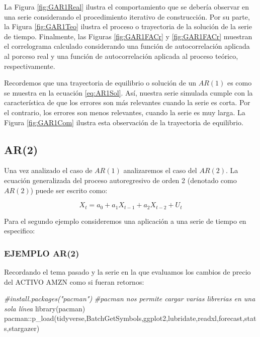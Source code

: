 \documentclass[
]{book}
\newenvironment{Shaded}{\begin{snugshade}}{\end{snugshade}}
\newcommand{\CommentTok}[1]{\textcolor[rgb]{0.56,0.35,0.01}{\textit{#1}}}
\newcommand{\FunctionTok}[1]{\textcolor[rgb]{0.00,0.00,0.00}{#1}}
\newcommand{\NormalTok}[1]{#1}
\newcommand{\SpecialCharTok}[1]{\textcolor[rgb]{0.00,0.00,0.00}{#1}}
\begin{document}
La Figura \ref{fig:GAR1Real} ilustra el comportamiento que se debería
observar en una serie considerando el procedimiento iterativo de
construcción. Por su parte, la Figura \ref{fig:GAR1Teo} ilustra el
proceso o trayectoria de la solución de la serie de tiempo. Finalmente,
las Figuras \ref{fig:GAR1FACr} y \ref{fig:GAR1FACr} muestran el
correlograma calculado considerando una función de autocorrelación
aplicada al porceso real y una función de autocorrelación aplicada al
proceso teórico, respectivamente.

Recordemos que una trayectoria de equilibrio o solución de un \(AR(1)\) es
como se muestra en la ecuación \eqref{eq:AR1Sol}. Así, nuestra serie
simulada cumple con la característica de que los errores son más
relevantes cuando la serie es corta. Por el contrario, los errores son
menos relevantes, cuando la serie es muy larga. La Figura
\ref{fig:GAR1Com} ilustra esta observación de la trayectoria de
equilibrio.

\hypertarget{ar2}{%
\subsection{AR(2)}\label{ar2}}

Una vez analizado el caso de \(AR(1)\) analizaremos el caso del \(AR(2)\).
La ecuación generalizada del proceso autoregresivo de orden 2 (denotado
como \(AR(2)\)) puede ser escrito como:

\begin{equation}
    X_t = a_0 + a_1 X_{t-1} + a_2 X_{t-2} + U_t
    \label{eq:AR2Eq}
\end{equation}

Para el segundo ejemplo consideremos una aplicación a una serie de
tiempo en especifico:

\hypertarget{ejemplo-ar2}{%
\subsubsection{EJEMPLO AR(2)}\label{ejemplo-ar2}}

Recordando el tema pasado y la serie en la que evaluamos los cambios de
precio del ACTIVO AMZN como si fueran retornos:

\begin{Shaded}
\begin{Highlighting}[]
\CommentTok{\#install.packages("pacman")}
\CommentTok{\#pacman nos permite cargar varias librerias en una sola línea}
\FunctionTok{library}\NormalTok{(pacman)}
\NormalTok{pacman}\SpecialCharTok{::}\FunctionTok{p\_load}\NormalTok{(tidyverse,BatchGetSymbols,ggplot2,lubridate,readxl,forecast,stats,stargazer)}
\end{Highlighting}
\end{Shaded}
\end{document}
